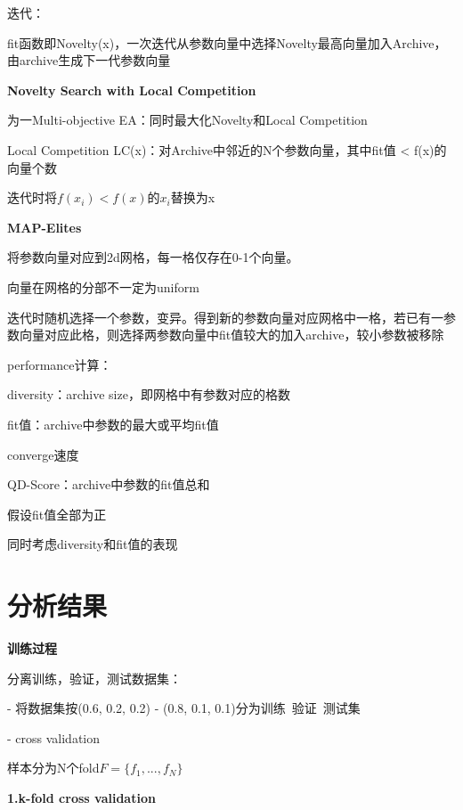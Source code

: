\documentclass[UTF8]{ctexart}
\begin{document}
  \quad 迭代：

  \quad \quad fit函数即Novelty(x)，一次迭代从参数向量中选择Novelty最高向量加入Archive，由archive生成下一代参数向量

  \textbf{Novelty Search with Local Competition}

  \quad 为一Multi-objective EA：同时最大化Novelty和Local Competition

  \quad Local Competition LC(x)：对Archive中邻近的N个参数向量，其中fit值 < f(x)的向量个数

  \quad \quad 迭代时将$f(x_i) < f(x)$的$x_i$替换为x

  \textbf{MAP-Elites}

  \quad 将参数向量对应到2d网格，每一格仅存在0-1个向量。

  \quad \quad 向量在网格的分部不一定为uniform

  \quad 迭代时随机选择一个参数，变异。得到新的参数向量对应网格中一格，若已有一参数向量对应此格，则选择两参数向量中fit值较大的加入archive，较小参数被移除

  \quad performance计算：

  \quad \quad diversity：archive size，即网格中有参数对应的格数

  \quad \quad fit值：archive中参数的最大或平均fit值

  \quad \quad converge速度

  \quad \quad QD-Score：archive中参数的fit值总和

  \quad \quad \quad 假设fit值全部为正

  \quad \quad \quad 同时考虑diversity和fit值的表现


  
\section{分析结果}
\noindent \textbf{训练过程}

  分离训练，验证，测试数据集：
  
  - 将数据集按(0.6, 0.2, 0.2) - (0.8, 0.1, 0.1)分为训练\ 验证\ 测试集

  - cross validation

  \quad 样本分为N个fold$F = \{f_1, ..., f_N\}$

  \quad \textbf{1.k-fold cross validation}
\end{document}
